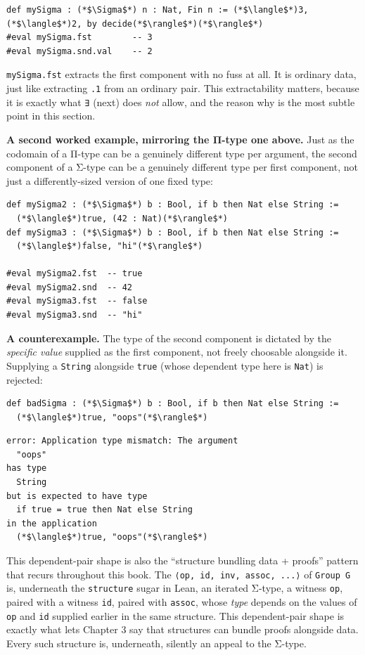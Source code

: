 \begin{lstlisting}
def mySigma : (*$\Sigma$*) n : Nat, Fin n := (*$\langle$*)3, (*$\langle$*)2, by decide(*$\rangle$*)(*$\rangle$*)
#eval mySigma.fst        -- 3
#eval mySigma.snd.val    -- 2
\end{lstlisting}

\texttt{mySigma.fst} extracts the first component with no fuss at all. It is ordinary data, just like extracting \texttt{.1} from an ordinary pair. This extractability matters, because it is exactly what \texttt{∃} (next) does \emph{not} allow, and the reason why is the most subtle point in this section.

\textbf{A second worked example, mirroring the Π-type one above.} Just as the codomain of a Π-type can be a genuinely different type per argument, the second component of a Σ-type can be a genuinely different type per first component, not just a differently-sized version of one fixed type:

\begin{lstlisting}
def mySigma2 : (*$\Sigma$*) b : Bool, if b then Nat else String :=
  (*$\langle$*)true, (42 : Nat)(*$\rangle$*)
def mySigma3 : (*$\Sigma$*) b : Bool, if b then Nat else String :=
  (*$\langle$*)false, "hi"(*$\rangle$*)

#eval mySigma2.fst  -- true
#eval mySigma2.snd  -- 42
#eval mySigma3.fst  -- false
#eval mySigma3.snd  -- "hi"
\end{lstlisting}

\textbf{A counterexample.} The type of the second component is dictated by the \emph{specific value} supplied as the first component, not freely choosable alongside it. Supplying a \texttt{String} alongside \texttt{true} (whose dependent type here is \texttt{Nat}) is rejected:

\begin{lstlisting}
def badSigma : (*$\Sigma$*) b : Bool, if b then Nat else String :=
  (*$\langle$*)true, "oops"(*$\rangle$*)
\end{lstlisting}

\begin{lstlisting}
error: Application type mismatch: The argument
  "oops"
has type
  String
but is expected to have type
  if true = true then Nat else String
in the application
  (*$\langle$*)true, "oops"(*$\rangle$*)
\end{lstlisting}

This dependent-pair shape is also the ``structure bundling data + proofs'' pattern that recurs throughout this book. The \texttt{⟨op, id, inv, assoc, ...⟩} of \texttt{Group G} is, underneath the \texttt{structure} sugar in Lean, an iterated Σ-type, a witness \texttt{op}, paired with a witness \texttt{id}, paired with \texttt{assoc}, whose \emph{type} depends on the values of \texttt{op} and \texttt{id} supplied earlier in the same structure. This dependent-pair shape is exactly what lets Chapter 3 say that structures can bundle proofs alongside data. Every such structure is, underneath, silently an appeal to the Σ-type.

